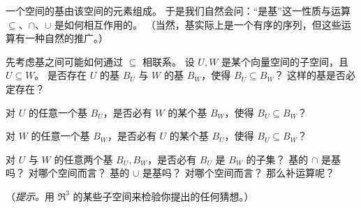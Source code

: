   \item 
    一个空间的基由该空间的元素组成。
    于是我们自然会问：“是基”这一性质与运算 $\subseteq$、$\cap$、$\cup$ 是如何相互作用的。
    （当然，基实际上是一个有序的序列，但这些运算有一种自然的推广。）
    \begin{exparts}
      \partsitem 先考虑基之间可能如何通过 $\subseteq$ 相联系。
        设 \( U,W \) 是某个向量空间的子空间，且 \( U\subseteq W \)。
        是否存在 \( U \) 的基 \( B_U \) 与 \( W \) 的基 \( B_W \)，使得 \( B_U\subseteq B_W \)？
        这样的基是否必定存在？

        对 \( U \) 的任意一个基 \( B_U \)，是否必有 \( W \) 的某个基 \( B_W \)，使得 \( B_U\subseteq B_W \)？

        对 \( W \) 的任意一个基 \( B_W \)，是否必有 \( U \) 的某个基 \( B_U \)，使得 \( B_U\subseteq B_W \)？

        对 \( U \) 与 \( W \) 的任意两个基 \( B_U, B_W \)，是否必有 \( B_U \) 是 \( B_W \) 的子集？
      \partsitem 基的 $\cap$ 是基吗？
        对哪个空间而言？
      \partsitem 基的 $\cup$ 是基吗？
        对哪个空间而言？
      \partsitem 那么补运算呢？
     \end{exparts}
     （\textit{提示。}用 \( \Re^3 \) 的某些子空间来检验你提出的任何猜想。）
